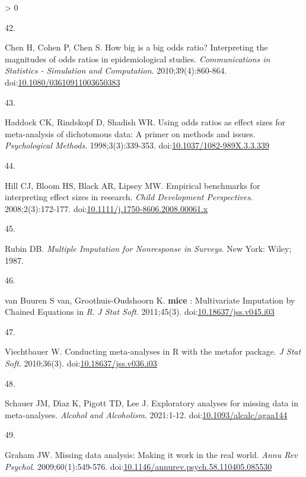 \documentclass[
]{article}
\newlength{\cslhangindent}
\newlength{\csllabelwidth}
\newenvironment{CSLReferences}[2] %
 {%
  \setlength{\parindent}{0pt}
  \ifodd #1 \everypar{\setlength{\hangindent}{\cslhangindent}}\ignorespaces\fi
  \ifnum #2 > 0
  \setlength{\parskip}{#2\baselineskip}
  \fi
 }%
 {}
\newcommand{\CSLLeftMargin}[1]{\parbox[t]{\csllabelwidth}{#1}}
\newcommand{\CSLRightInline}[1]{\parbox[t]{\linewidth - \csllabelwidth}{#1}\break}
\begin{document}
\begin{CSLReferences}{0}{0}
\leavevmode\hypertarget{ref-chenHowBigBig2010}{}%
\CSLLeftMargin{42. }
\CSLRightInline{Chen H, Cohen P, Chen S. How big is a big odds ratio? Interpreting the magnitudes of odds ratios in epidemiological studies. \emph{Communications in Statistics - Simulation and Computation}. 2010;39(4):860-864. doi:\href{https://doi.org/10.1080/03610911003650383}{10.1080/03610911003650383}}

\leavevmode\hypertarget{ref-haddockUsingOddsRatios1998}{}%
\CSLLeftMargin{43. }
\CSLRightInline{Haddock CK, Rindskopf D, Shadish WR. Using odds ratios as effect sizes for meta-analysis of dichotomous data: A primer on methods and issues. \emph{Psychological Methods}. 1998;3(3):339-353. doi:\href{https://doi.org/10.1037/1082-989X.3.3.339}{10.1037/1082-989X.3.3.339}}

\leavevmode\hypertarget{ref-hillBenchmarks2008}{}%
\CSLLeftMargin{44. }
\CSLRightInline{Hill CJ, Bloom HS, Black AR, Lipsey MW. Empirical benchmarks for interpreting effect sizes in research. \emph{Child Development Perspectives}. 2008;2(3):172-177. doi:\href{https://doi.org/10.1111/j.1750-8606.2008.00061.x}{10.1111/j.1750-8606.2008.00061.x}}

\leavevmode\hypertarget{ref-rubinMultipleImputationNonresponse1987}{}%
\CSLLeftMargin{45. }
\CSLRightInline{Rubin DB. \emph{Multiple Imputation for Nonresponse in Surveys}. New York: Wiley; 1987.}

\leavevmode\hypertarget{ref-vanbuurenMiceMultivariateImputation2011}{}%
\CSLLeftMargin{46. }
\CSLRightInline{van Buuren S van, Groothuis-Oudshoorn K. \textbf{mice} : Multivariate Imputation by Chained Equations in \emph{R}. \emph{J Stat Soft}. 2011;45(3). doi:\href{https://doi.org/10.18637/jss.v045.i03}{10.18637/jss.v045.i03}}

\leavevmode\hypertarget{ref-viechtbauerConductingMetaanalysesMetafor2010}{}%
\CSLLeftMargin{47. }
\CSLRightInline{Viechtbauer W. Conducting meta-analyses in R with the metafor package. \emph{J Stat Soft}. 2010;36(3). doi:\href{https://doi.org/10.18637/jss.v036.i03}{10.18637/jss.v036.i03}}

\leavevmode\hypertarget{ref-schauerExploratoryAnalysesMissingunderreview}{}%
\CSLLeftMargin{48. }
\CSLRightInline{Schauer JM, Dìaz K, Pigott TD, Lee J. Exploratory analyses for missing data in meta-analyses. \emph{Alcohol and Alcoholism}. 2021:1-12. doi:\href{https://doi.org/10.1093/alcalc/agaa144}{10.1093/alcalc/agaa144}}

\leavevmode\hypertarget{ref-grahamMissingDataAnalysis2009}{}%
\CSLLeftMargin{49. }
\CSLRightInline{Graham JW. Missing data analysis: Making it work in the real world. \emph{Annu Rev Psychol}. 2009;60(1):549-576. doi:\href{https://doi.org/10.1146/annurev.psych.58.110405.085530}{10.1146/annurev.psych.58.110405.085530}}


\end{CSLReferences}
\end{document}
